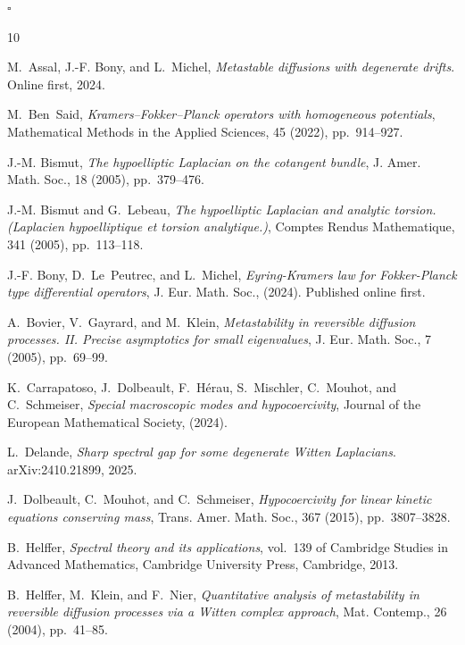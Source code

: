 \documentclass[12pt]{amsart}
\newcommand{\ep}{\hfill $\square$}
\numberwithin{equation}{section}
\numberwithin{figure}{section}
\begin{document}
\ep

\vfill
\begin{thebibliography}{10}

{\sc M.~Assal, %
J.-F. Bony, and L.~Michel}, {\em Metastable diffusions with degenerate drifts}.
\newblock Online first, 2024.

{\sc M.~Ben~Said}, {\em {K}ramers–{F}okker–{P}lanck operators with homogeneous potentials}, Mathematical Methods in the Applied Sciences, 45 (2022), pp.~914--927.

{\sc J.-M. Bismut}, {\em The hypoelliptic {L}aplacian on the cotangent bundle}, J. Amer. Math. Soc., 18 (2005), pp.~379--476.

{\sc J.-M. Bismut and G.~Lebeau}, {\em The hypoelliptic {L}aplacian and analytic torsion. ({L}aplacien hypoelliptique et torsion analytique.)}, Comptes Rendus Mathematique, 341 (2005), pp.~113--118.

{\sc J.-F. Bony, D.~Le~Peutrec, and L.~Michel}, {\em {Eyring-Kramers law for Fokker-Planck type differential operators}}, J. Eur. Math. Soc.,  (2024).
\newblock Published online first.

{\sc A.~Bovier, V.~Gayrard, and M.~Klein}, {\em Metastability in reversible diffusion processes. {II}. {P}recise asymptotics for small eigenvalues}, J. Eur. Math. Soc., 7 (2005), pp.~69--99.

{\sc K.~Carrapatoso, J.~Dolbeault, F.~H\'erau, S.~Mischler, C.~Mouhot, and C.~Schmeiser}, {\em Special macroscopic modes and hypocoercivity}, Journal of the European Mathematical Society,  (2024).

{\sc L.~Delande}, {\em Sharp spectral gap for some degenerate {W}itten {L}aplacians}.
\newblock arXiv:2410.21899, 2025.

{\sc J.~Dolbeault, C.~Mouhot, and C.~Schmeiser}, {\em Hypocoercivity for linear kinetic equations conserving mass}, Trans. Amer. Math. Soc., 367 (2015), pp.~3807--3828.

{\sc B.~Helffer}, {\em Spectral theory and its applications}, vol.~139 of Cambridge Studies in Advanced Mathematics, Cambridge University Press, Cambridge, 2013.

{\sc B.~Helffer, M.~Klein, and F.~Nier}, {\em Quantitative analysis of metastability in reversible diffusion processes via a {W}itten complex approach}, Mat. Contemp., 26 (2004), pp.~41--85.


\end{thebibliography}
\end{document}
